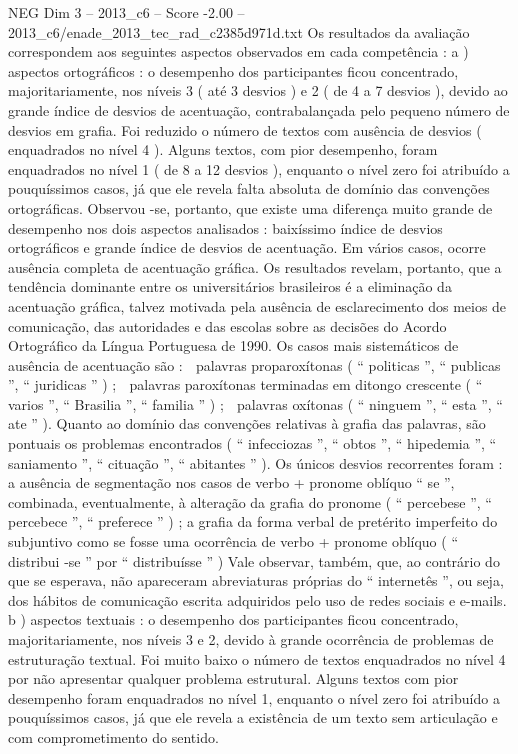 \begin{textsample}{NEG Dim 3 – 2013\_c6 – Score -2.00 – 2013\_c6/enade\_2013\_tec\_rad\_c2385d971d.txt}
Os resultados da avaliação correspondem aos seguintes aspectos observados em cada competência : a ) aspectos ortográficos : o desempenho dos participantes ficou concentrado, majoritariamente, nos níveis 3 ( até 3 desvios ) e 2 ( de 4 a 7 desvios ), devido ao grande índice de desvios de acentuação, contrabalançada pelo pequeno número de desvios em grafia.
Foi reduzido o número de textos com ausência de desvios ( enquadrados no nível 4 ).
Alguns textos, com pior desempenho, foram enquadrados no nível 1 ( de 8 a 12 desvios ), enquanto o nível zero foi atribuído a pouquíssimos casos, já que ele revela falta absoluta de domínio das convenções ortográficas.
Observou -se, portanto, que existe uma diferença muito grande de desempenho nos dois aspectos analisados : baixíssimo índice de desvios ortográficos e grande índice de desvios de acentuação.
Em vários casos, ocorre ausência completa de acentuação gráfica.
Os resultados revelam, portanto, que a tendência dominante entre os universitários brasileiros é a eliminação da acentuação gráfica, talvez motivada pela ausência de esclarecimento dos meios de comunicação, das autoridades e das escolas sobre as decisões do Acordo Ortográfico da Língua Portuguesa de 1990.
Os casos mais sistemáticos de ausência de acentuação são :  palavras proparoxítonas ( “ politicas ”, “ publicas ”, “ juridicas ” ) ;  palavras paroxítonas terminadas em ditongo crescente ( “ varios ”, “ Brasilia ”, “ familia ” ) ;  palavras oxítonas ( “ ninguem ”, “ esta ”, “ ate ” ).
Quanto ao domínio das convenções relativas à grafia das palavras, são pontuais os problemas encontrados ( “ infecciozas ”, “ obtos ”, “ hipedemia ”, “ saniamento ”, “ cituação ”, “ abitantes ” ).
Os únicos desvios recorrentes foram : a ausência de segmentação nos casos de verbo + pronome oblíquo “ se ”, combinada, eventualmente, à alteração da grafia do pronome ( “ percebese ”, “ percebece ”, “ preferece ” ) ; a grafia da forma verbal de pretérito imperfeito do subjuntivo como se fosse uma ocorrência de verbo + pronome oblíquo ( “ distribui -se ” por “ distribuísse ” ) Vale observar, também, que, ao contrário do que se esperava, não apareceram abreviaturas próprias do “ internetês ”, ou seja, dos hábitos de comunicação escrita adquiridos pelo uso de redes sociais e e-mails. b ) aspectos textuais : o desempenho dos participantes ficou concentrado, majoritariamente, nos níveis 3 e 2, devido à grande ocorrência de problemas de estruturação textual.
Foi muito baixo o número de textos enquadrados no nível 4 por não apresentar qualquer problema estrutural.
Alguns textos com pior desempenho foram enquadrados no nível 1, enquanto o nível zero foi atribuído a pouquíssimos casos, já que ele revela a existência de um texto sem articulação e com comprometimento do sentido.

\end{textsample}
